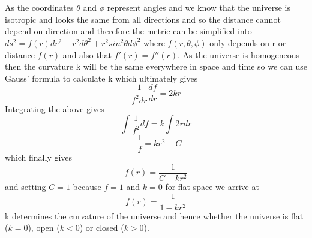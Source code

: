 \documentclass[a4paper,12pt]{article}
\begin{document}
\section{}
As the coordinates $\theta$ and $\phi$ represent angles and we know that the universe is isotropic and looks the same from all
directions and so the distance cannot depend on direction and therefore the metric can be simplified into 
$ds^2=f(r)dr^2+r^2d\theta^2+r^2sin^2\theta d\phi^2$ where $f(r,\theta,\phi)$ only
depends on r or distance $f(r)$ and also that $f'(r)=f''(r)$.
As the universe is homogeneous then the curvature k will be the same everywhere in space and time so we can use Gauss'
formula to calculate k which ultimately gives
\begin{equation}
\frac{1}{f^2dr}\frac{df}{dr}=2kr
\end{equation}
Integrating the above gives
\begin{equation}
\int\frac{1}{f^2}df=k\int 2r dr
\end{equation}
\begin{equation}
-\frac{1}{f}=kr^2-C
\end{equation}
which finally gives
\begin{equation}
f(r)=\frac{1}{C-kr^2}
\end{equation}
and setting $C=1$ because $f=1$ and $k=0$ for flat space we arrive at
\begin{equation}
f(r)=\frac{1}{1-kr^2}
\end{equation}
k determines the curvature of the universe and hence whether the universe is flat ($k=0$), open ($k<0$) or closed ($k>0$).
\end{document}
